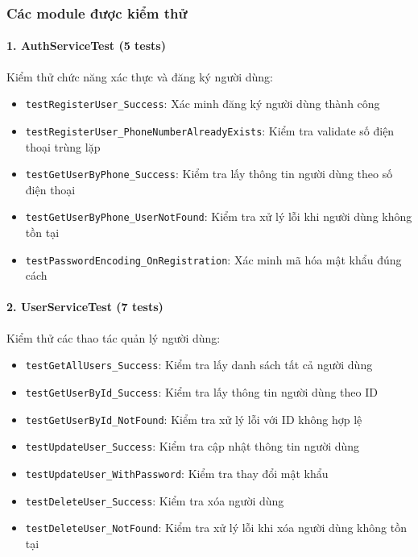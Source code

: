 \subsubsection{Các module được kiểm thử}

\paragraph{1. AuthServiceTest (5 tests)}
Kiểm thử chức năng xác thực và đăng ký người dùng:
\begin{itemize}
    \item \texttt{testRegisterUser\_Success}: Xác minh đăng ký người dùng thành công
    \item \texttt{testRegisterUser\_PhoneNumberAlreadyExists}: Kiểm tra validate số điện thoại trùng lặp
    \item \texttt{testGetUserByPhone\_Success}: Kiểm tra lấy thông tin người dùng theo số điện thoại
    \item \texttt{testGetUserByPhone\_UserNotFound}: Kiểm tra xử lý lỗi khi người dùng không tồn tại
    \item \texttt{testPasswordEncoding\_OnRegistration}: Xác minh mã hóa mật khẩu đúng cách
\end{itemize}

\paragraph{2. UserServiceTest (7 tests)}
Kiểm thử các thao tác quản lý người dùng:
\begin{itemize}
    \item \texttt{testGetAllUsers\_Success}: Kiểm tra lấy danh sách tất cả người dùng
    \item \texttt{testGetUserById\_Success}: Kiểm tra lấy thông tin người dùng theo ID
    \item \texttt{testGetUserById\_NotFound}: Kiểm tra xử lý lỗi với ID không hợp lệ
    \item \texttt{testUpdateUser\_Success}: Kiểm tra cập nhật thông tin người dùng
    \item \texttt{testUpdateUser\_WithPassword}: Kiểm tra thay đổi mật khẩu
    \item \texttt{testDeleteUser\_Success}: Kiểm tra xóa người dùng
    \item \texttt{testDeleteUser\_NotFound}: Kiểm tra xử lý lỗi khi xóa người dùng không tồn tại
\end{itemize}

